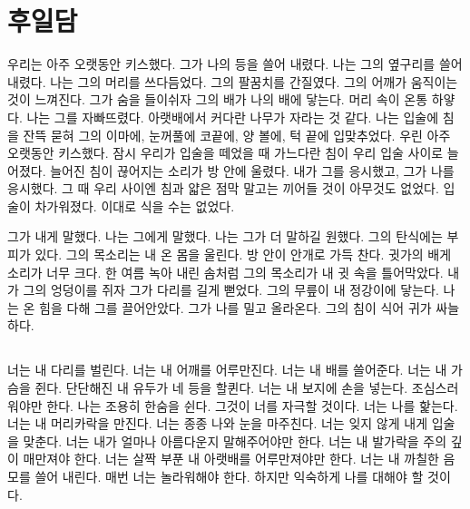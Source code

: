 \documentclass[12pt, b6paper, openany]{memoir}
\newenvironment{article}{}{}
\begin{document}
\begin{article}
\hypertarget{uxd6c4uxc77cuxb2f4}{%

\chapter{후일담}\label{uxd6c4uxc77cuxb2f4}}



우리는 아주 오랫동안 키스했다. 그가 나의 등을 쓸어 내렸다. 나는 그의 옆구리를 쓸어 내렸다. 나는 그의 머리를 쓰다듬었다. 그의 팔꿈치를 간질였다. 그의 어깨가 움직이는 것이 느껴진다. 그가 숨을 들이쉬자 그의 배가 나의 배에 닿는다. 머리 속이 온통 하얗다. 나는 그를 자빠뜨렸다. 아랫배에서 커다란 나무가 자라는 것 같다. 나는 입술에 침을 잔뜩 묻혀 그의 이마에, 눈꺼풀에 코끝에, 양 볼에, 턱 끝에 입맞추었다. 우린 아주 오랫동안 키스했다. 잠시 우리가 입술을 떼었을 때 가느다란 침이 우리 입술 사이로 늘어졌다. 늘어진 침이 끊어지는 소리가 방 안에 울렸다. 내가 그를 응시했고, 그가 나를 응시했다. 그 때 우리 사이엔 침과 얇은 점막 말고는 끼어들 것이 아무것도 없었다. 입술이 차가워졌다. 이대로 식을 수는 없었다.



그가 내게 말했다. 나는 그에게 말했다. 나는 그가 더 말하길 원했다. 그의 탄식에는 부피가 있다. 그의 목소리는 내 온 몸을 울린다. 방 안이 안개로 가득 찬다. 귓가의 배게 소리가 너무 크다. 한 여름 녹아 내린 솜처럼 그의 목소리가 내 귓 속을 틀어막았다. 내가 그의 엉덩이를 쥐자 그가 다리를 길게 뻗었다. 그의 무릎이 내 정강이에 닿는다. 나는 온 힘을 다해 그를 끌어안았다. 그가 나를 밀고 올라온다. 그의 침이 식어 귀가 싸늘하다.



\hypertarget{section}{%

\section{}\label{section}}



너는 내 다리를 벌린다. 너는 내 어깨를 어루만진다. 너는 내 배를 쓸어준다. 너는 내 가슴을 쥔다. 단단해진 내 유두가 네 등을 할퀸다. 너는 내 보지에 손을 넣는다. 조심스러워야만 한다. 나는 조용히 한숨을 쉰다. 그것이 너를 자극할 것이다. 너는 나를 핥는다. 너는 내 머리카락을 만진다. 너는 종종 나와 눈을 마주친다. 너는 잊지 않게 내게 입술을 맞춘다. 너는 내가 얼마나 아름다운지 말해주어야만 한다. 너는 내 발가락을 주의 깊이 매만져야 한다. 너는 살짝 부푼 내 아랫배를 어루만져야만 한다. 너는 내 까칠한 음모를 쓸어 내린다. 매번 너는 놀라워해야 한다. 하지만 익숙하게 나를 대해야 할 것이다.




\end{article}
\end{document}
